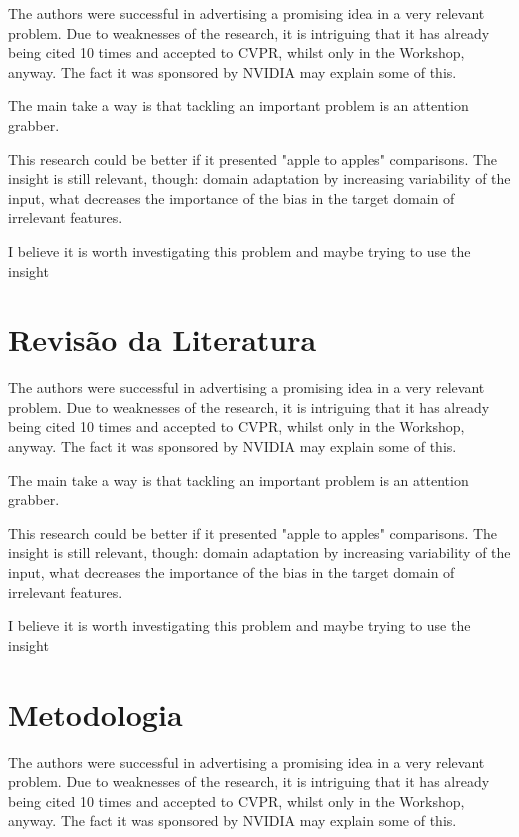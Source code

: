 \documentclass[
12pt, %
a4paper, %
onecolumn, %
]{article}
\begin{document}
The authors were successful in advertising a promising idea in a very relevant problem.  Due to weaknesses of the research, it is intriguing that it has already being cited 10 times and accepted to CVPR, whilst only in the Workshop, anyway. The fact it was sponsored by NVIDIA may explain some of this.

The main take a way is that tackling an important problem is an attention grabber. 

This research could be better if it presented "apple to apples" comparisons. The insight is still relevant, though: domain adaptation by increasing variability of the input, what decreases the importance of the bias in the target domain of irrelevant features.

I believe it is worth investigating this problem and maybe trying to use the insight


\section{Revisão da Literatura}

The authors were successful in advertising a promising idea in a very relevant problem.  Due to weaknesses of the research, it is intriguing that it has already being cited 10 times and accepted to CVPR, whilst only in the Workshop, anyway. The fact it was sponsored by NVIDIA may explain some of this.

The main take a way is that tackling an important problem is an attention grabber. 

This research could be better if it presented "apple to apples" comparisons. The insight is still relevant, though: domain adaptation by increasing variability of the input, what decreases the importance of the bias in the target domain of irrelevant features.

I believe it is worth investigating this problem and maybe trying to use the insight


\section{Metodologia}

The authors were successful in advertising a promising idea in a very relevant problem.  Due to weaknesses of the research, it is intriguing that it has already being cited 10 times and accepted to CVPR, whilst only in the Workshop, anyway. The fact it was sponsored by NVIDIA may explain some of this.
\end{document}
